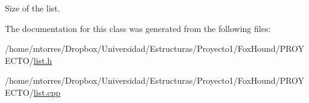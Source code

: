 Size of the list. 



The documentation for this class was generated from the following files\-:\begin{DoxyCompactItemize}
\item 
/home/mtorres/\-Dropbox/\-Universidad/\-Estructuras/\-Proyecto1/\-Fox\-Hound/\-P\-R\-O\-Y\-E\-C\-T\-O/\hyperlink{list_8h}{list.\-h}\item 
/home/mtorres/\-Dropbox/\-Universidad/\-Estructuras/\-Proyecto1/\-Fox\-Hound/\-P\-R\-O\-Y\-E\-C\-T\-O/\hyperlink{list_8cpp}{list.\-cpp}\end{DoxyCompactItemize}
